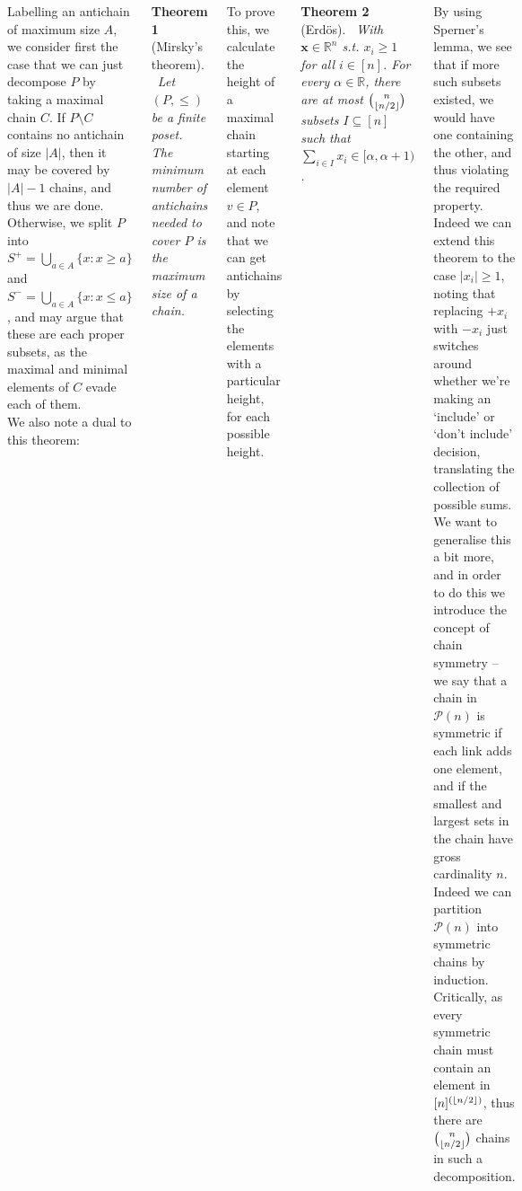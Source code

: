 \documentclass{tikzposter} %
\newcommand{\mc}{\mathcal}
\DeclarePairedDelimiter{\floor}{\lfloor}{\rfloor}
\newcommand\rightopen[2]{\ensuremath{[#1,#2)}}
\newtheorem{theorem}{Theorem}
\begin{document}
\begin{columns}
{    Labelling an antichain of maximum size $A$, we consider first the case that we can just decompose $P$ by taking a maximal chain $C$. If $P \setminus C$ contains no antichain of size $|A|$, then it may be covered by $|A|-1$ chains, and thus we are done. Otherwise, we split $P$ into $S^+ = \bigcup_{a \in A} \{x : x \ge a\}$ and $S^- = \bigcup_{a \in A} \{x : x \le a\}$, and may argue that these are each proper subsets, as the maximal and minimal elements of $C$ evade each of them. \\

    We also note a dual to this theorem:
    \begin{theorem}[Mirsky's theorem]
    \ Let $(P, \le)$ be a finite poset. The minimum number of antichains needed to cover $P$ is the maximum size of a chain.
    \end{theorem}
    \hphantom{}

    To prove this, we calculate the height of a maximal chain starting at each element $v \in P$, and note that we can get antichains by selecting the elements with a particular height, for each possible height. \\

    \begin{theorem}[Erd\"{o}s]
    \ With $\bm{x} \in \mathbb{R}^n$ s.t. $x_i \ge 1$ for all $i \in [n]$. For every $\alpha \in \mathbb{R}$, there are at most ${n \choose \floor{n/2}}$ subsets $I \subseteq [n]$ such that $\sum_{i \in I} x_i \in \rightopen{\alpha}{\alpha+1}$.
    \end{theorem}
    \hphantom{}

    By using Sperner's lemma, we see that if more such subsets existed, we would have one containing the other, and thus violating the required property. \\

    Indeed we can extend this theorem to the case $|x_i| \ge 1$, noting that replacing $+x_i$ with $-x_i$ just switches around whether we're making an `include' or `don't include' decision, translating the collection of possible sums. \\

    We want to generalise this a bit more, and in order to do this we introduce the concept of chain symmetry -- we say that a chain in $\mc{P}(n)$ is symmetric if each link adds one element, and if the smallest and largest sets in the chain have gross cardinality $n$. Indeed we can partition $\mc{P}(n)$ into symmetric chains by induction. Critically, as every symmetric chain must contain an element in $[n]^{(\floor{n/2})}$, thus there are ${n \choose \floor{n/2}}$ chains in such a decomposition.\\

}
\end{columns}
\end{document}
